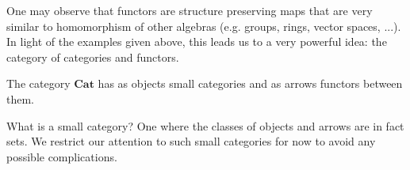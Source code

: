 \documentclass{article}
\begin{document}
One may observe that functors are structure preserving maps that are very similar to homomorphism
of other algebras (e.g. groups, rings, vector spaces, ...). In light of the examples given above, 
this leads us to a very powerful idea: the category of categories and functors.

\newcommand{\Cat}{\mathbf{Cat}}
\begin{definition}
    The category $\Cat$ has as objects small categories and as arrows functors between them.
\end{definition}

What is a small category? One where the classes of objects and arrows are in fact sets. We restrict 
our attention to such small categories for now to avoid any possible complications.
\end{document}
